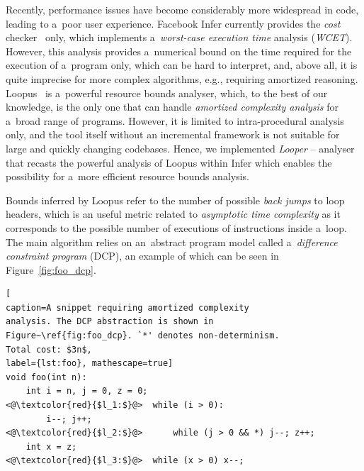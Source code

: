 \documentclass{ExcelAtFIT}
\begin{document}
Recently, performance issues have become
considerably more widespread in code, leading
to a~poor user experience. Facebook Infer
currently provides the \emph{cost}
checker~\cite{cost-checker} only, which implements
a~\emph{worst-case execution time} analysis
(\emph{WCET}). However, this analysis provides
a~numerical bound on the time required for the
execution of a~program only, which can be hard
to interpret, and, above all, it is quite
imprecise for more complex algorithms, e.g.,
requiring amortized reasoning.
Loopus~\cite{loopus-tool} is a~powerful resource
bounds analyser, which, to the best of our
knowledge, is the only one that can handle
\emph{amortized complexity analysis} for
a~broad range of programs. However, it is
limited to intra-procedural analysis only,
and the tool itself without an incremental
framework is not suitable for large and quickly
changing codebases. Hence, we implemented
\textit{Looper} -- analyser that recasts the
powerful analysis of Loopus within Infer which
enables the possibility for a~more efficient
resource bounds analysis.

Bounds inferred by Loopus refer to the number
of possible \textit{back jumps} to loop headers, which
is an useful metric related to
\textit{asymptotic time complexity} as it corresponds
to the possible number of executions of instructions
inside a~loop. The main algorithm relies on
an~abstract program model called
a~\textit{difference constraint program} (DCP), an example
of which can be seen in Figure~\ref{fig:foo_dcp}.
\vspace{-1mm}
\begin{lstlisting}[
caption=A snippet requiring amortized complexity
analysis. The DCP abstraction is shown in
Figure~\ref{fig:foo_dcp}. `*' denotes non-determinism.
Total cost: $3n$,
label={lst:foo}, mathescape=true]
void foo(int n):
    int i = n, j = 0, z = 0;
<@\textcolor{red}{$l_1:$}@>  while (i > 0):
        i--; j++;
<@\textcolor{red}{$l_2:$}@>      while (j > 0 && *) j--; z++;
    int x = z;
<@\textcolor{red}{$l_3:$}@>  while (x > 0) x--;
\end{lstlisting}
\end{document}
